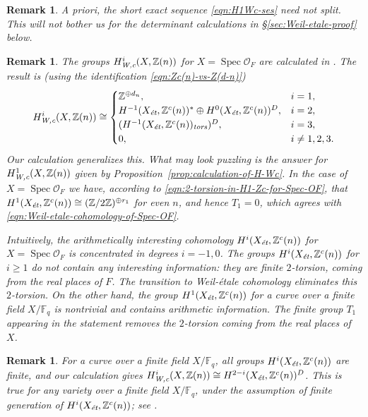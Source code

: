 \documentclass[draft]{article}
\DeclareMathOperator{\Spec}{Spec}
\newcommand{\FF}{\mathbb{F}}
\newcommand{\ZZ}{\mathbb{Z}}
\newcommand{\et}{\text{\it \'{e}t}}
\newcommand{\tors}{\text{\it tors}}
\newcommand{\Wc}{\text{\it W,c}}
\theoremstyle{myplain}
\theoremstyle{mydefinition}
\newtheorem{remark}[theorem]{Remark}
\begin{document}
\begin{remark}
  A priori, the short exact sequence \eqref{eqn:H1Wc-ses} need not split.
  This will not bother us for the determinant calculations in
  \S\ref{sec:Weil-etale-proof} below.
\end{remark}

\begin{remark}
  The groups $H^i_\Wc (X, \ZZ(n))$ for $X = \Spec \mathcal{O}_F$ are calculated
  in \cite[\S 5.8.3]{Flach-Morin-2018}. The result is (using the identification
  \eqref{eqn:Zc(n)-vs-Z(d-n)})
  \begin{equation}
    \label{eqn:Weil-etale-cohomology-of-Spec-OF}
    H^i_\Wc (X, \ZZ(n)) \cong
    \begin{cases}
      \ZZ^{\oplus d_n}, & i = 1, \\
      H^{-1} (X_\et, \ZZ^c (n))^* \oplus H^0 (X_\et, \ZZ^c (n))^D, & i = 2, \\
      (H^{-1} (X_\et, \ZZ^c (n))_\tors)^D, & i = 3, \\
      0, & i \ne 1,2,3.
    \end{cases}
  \end{equation}
  Our calculation generalizes this. What may look puzzling is the answer for
  $H^1_\Wc (X,\ZZ(n))$ given by Proposition~\ref{prop:calculation-of-H-Wc}.
  In the case of $X = \Spec \mathcal{O}_F$ we have, according to
  \eqref{eqn:2-torsion-in-H1-Zc-for-Spec-OF}, that
  $H^1 (X_\et, \ZZ^c(n)) \cong (\ZZ/2\ZZ)^{\oplus r_1}$ for even $n$, and
  hence $T_1 = 0$, which agrees with
  \eqref{eqn:Weil-etale-cohomology-of-Spec-OF}.

  Intuitively, the arithmetically interesting cohomology $H^i (X_\et, \ZZ^c(n))$
  for $X = \Spec \mathcal{O}_F$ is concentrated in degrees $i = -1,0$. The
  groups $H^i (X_\et, \ZZ^c (n))$ for $i \ge 1$ do not contain any interesting
  information: they are finite $2$-torsion, coming from the real places of
  $F$. The transition to Weil-\'{e}tale cohomology eliminates this
  $2$-torsion. On the other hand, the group $H^1 (X_\et, \ZZ^c (n))$ for a curve
  over a finite field $X/\FF_q$ is nontrivial and contains arithmetic
  information. The finite group $T_1$ appearing in the statement removes the
  $2$-torsion coming from the real places of $X$.
\end{remark}

\begin{remark}
  For a curve over a finite field $X/\FF_q$, all groups $H^i (X_\et, \ZZ^c(n))$
  are finite, and our calculation gives
  $H^i_\Wc (X, \ZZ(n)) \cong H^{2-i} (X_\et, \ZZ^c(n))^D$.
  This is true for any variety over a finite field $X/\FF_q$, under the
  assumption of finite generation of $H^i (X_\et, \ZZ^c(n))$;
  see \cite[Proposition~7.7]{Beshenov-Weil-etale-1}.
\end{remark}
\end{document}
